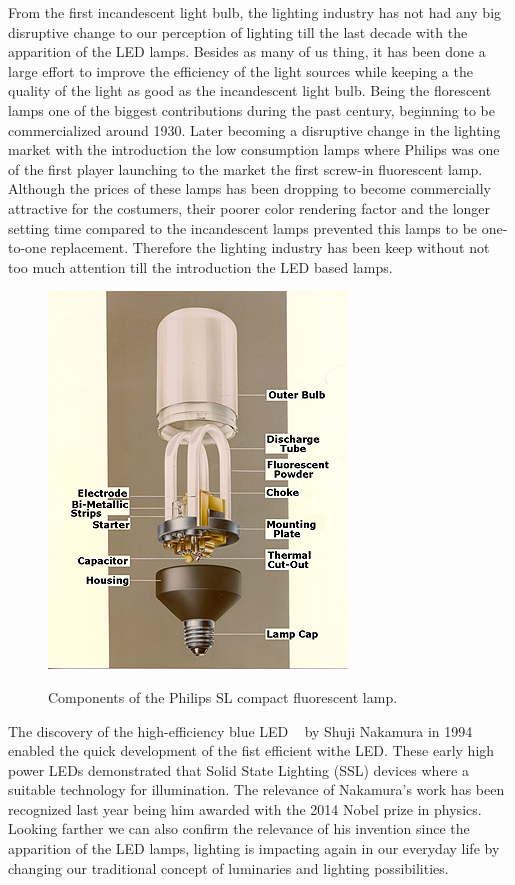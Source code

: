 From the first incandescent light bulb, the lighting industry has not had any big disruptive change to our perception of lighting till the last decade with the apparition of the LED lamps. Besides as many of us thing, it has been done a large effort to improve the efficiency of the light sources while keeping a the quality of the light as good as the incandescent light bulb. Being the florescent lamps one of the biggest contributions during the past century, beginning  to be commercialized around 1930. Later becoming a disruptive change in the lighting market with the introduction the low consumption lamps where Philips was one of the first player launching to the market the first screw-in fluorescent lamp. Although the prices of these lamps has been dropping to become commercially attractive for the costumers, their poorer color rendering factor and the longer setting time compared to the incandescent lamps prevented this lamps to be one-to-one replacement. Therefore the lighting industry has been keep without not too much attention till the introduction the LED based lamps.

\begin{figure}[!h]
\centering
\includegraphics{./0_intro/img/phil1b.jpg}
\label{fig:philips_sl}
\caption{Components of the Philips SL compact fluorescent lamp. }
\end{figure}

The discovery of the high-efficiency blue LED ~\cite{94Nakamura} by Shuji Nakamura in 1994 enabled the quick development of the fist efficient withe LED. These early high power LEDs demonstrated that Solid State Lighting (SSL) devices  where a suitable technology for illumination. The relevance of Nakamura's work has been recognized last year being him awarded with the 2014 Nobel prize in physics. Looking farther we can also confirm the relevance of his invention since the apparition of the LED lamps, lighting is impacting again in our everyday life by changing our traditional concept of luminaries and lighting possibilities.

